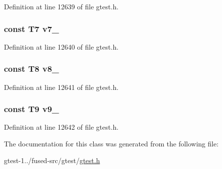 \-Definition at line 12639 of file gtest.\-h.

\hypertarget{classtesting_1_1internal_1_1ValueArray42_a4063f0b7a528133d018ee488ba44a9a3}{
\subsubsection[{v7\-\_\-}]{\setlength{\rightskip}{0pt plus 5cm}const \-T7 {\bf v7\-\_\-}}}\label{d0/dd6/classtesting_1_1internal_1_1ValueArray42_a4063f0b7a528133d018ee488ba44a9a3}


\-Definition at line 12640 of file gtest.\-h.

\hypertarget{classtesting_1_1internal_1_1ValueArray42_a596bc5260b2474271d1f6910ff6f665d}{
\subsubsection[{v8\-\_\-}]{\setlength{\rightskip}{0pt plus 5cm}const \-T8 {\bf v8\-\_\-}}}\label{d0/dd6/classtesting_1_1internal_1_1ValueArray42_a596bc5260b2474271d1f6910ff6f665d}


\-Definition at line 12641 of file gtest.\-h.

\hypertarget{classtesting_1_1internal_1_1ValueArray42_a6356e16cf54a9dfac8525f20242af31e}{
\subsubsection[{v9\-\_\-}]{\setlength{\rightskip}{0pt plus 5cm}const \-T9 {\bf v9\-\_\-}}}\label{d0/dd6/classtesting_1_1internal_1_1ValueArray42_a6356e16cf54a9dfac8525f20242af31e}


\-Definition at line 12642 of file gtest.\-h.



\-The documentation for this class was generated from the following file\-:\begin{DoxyCompactItemize}
\item 
gtest-\/1../fused-\/src/gtest/\hyperlink{fused-src_2gtest_2gtest_8h}{gtest.\-h}\end{DoxyCompactItemize}
